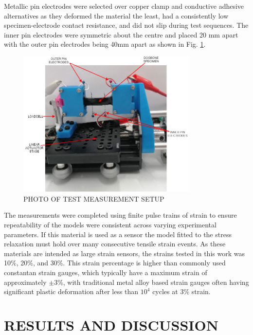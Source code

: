 Metallic pin electrodes were selected over copper clamp and conductive adhesive alternatives as they deformed the material the least, had a consistently low specimen-electrode contact resistance, and did not slip during test sequences. The inner pin electrodes were symmetric about the centre and placed 20 mm apart with the outer pin electrodes being 40mm apart as shown in Fig. \ref{fig:electromech-setup}.
\begin{figure}[H]
	\centering
	\includegraphics[width=9cm]{Figures/ELECTROMECH-SETUP.png}
	\caption{PHOTO OF TEST MEASUREMENT SETUP}
	\label{fig:electromech-setup}
\end{figure}
The measurements were completed using finite pulse trains of strain to ensure repeatability of the models were consistent across varying experimental parameters. If this material is used as a sensor the model fitted to the stress relaxation must hold over many consecutive tensile strain events. As these materials are intended as large strain sensors, the strains tested in this work was 10\%, 20\%, and 30\%. This strain percentage is higher than commonly used constantan strain gauges, which typically have a maximum strain of approximately $\pm 3$\%\cite{VishayPG2018}, with traditional metal alloy based strain gauges often having significant plastic deformation after less than $10^4$ cycles\cite{VishayPG2018} at 3\% strain.



\section*{RESULTS AND DISCUSSION}


